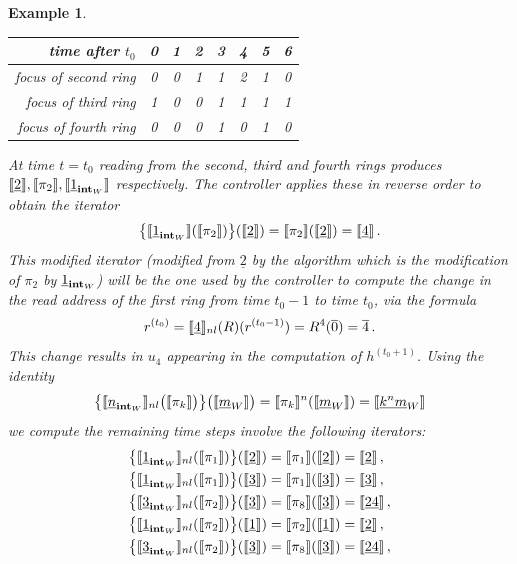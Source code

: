 \documentclass[english,letter paper,12pt,leqno]{article}
\theoremstyle{example}
\newtheorem{example}[theorem]{Example}
\numberwithin{equation}{section}
\begin{document}
\begin{example}
\begin{center}
\begin{tabular}{|r|c|c|c|c|c|c|c|}
\hline
time after $t_0$ & 0 & 1 & 2 & 3 & 4 & 5 & 6\\
\hline
focus of second ring & 0 & 0 & 1 & 1 & 2 & 1 & 0\\
\hline
focus of third ring & 1 & 0 & 0 & 1 & 1 & 1 & 1\\
\hline
focus of fourth ring & 0 & 0 & 0 & 1 & 0 & 1 & 0\\
\hline
\end{tabular}
\end{center}
At time $t = t_0$ reading from the second, third and fourth rings produces $\llbracket \underline{2} \rrbracket, \llbracket \pi_2 \rrbracket, \llbracket \underline{1}_{\textbf{int}_W} \rrbracket$ respectively. The controller applies these in reverse order to obtain the iterator
\[
\big\{ \llbracket \underline{1}_{\textbf{int}_W} \rrbracket( \llbracket \pi_2 \rrbracket ) \big\}( \llbracket \underline{2} \rrbracket ) = \llbracket \pi_2 \rrbracket( \llbracket \underline{2} \rrbracket ) = \llbracket \underline{4} \rrbracket\,.
\]
This modified iterator (modified from $\underline{2}$ by the algorithm which is the modification of $\pi_2$ by $\underline{1}_{\textbf{int}_W}$) will be the one used by the controller to compute the change in the read address of the first ring from time $t_0 - 1$ to time $t_0$, via the formula
\[
r^{(t_0)} = \llbracket \underline{4} \rrbracket_{nl}(R)( r^{(t_0 - 1)} ) = R^4( \overline{0} ) = \overline{4}\,.
\]
This change results in $u_4$ appearing in the computation of $h^{(t_0+1)}$. Using the identity
\begin{gather*}
\big\{\llbracket \underline{n}_{\textbf{int}_W} \rrbracket_{nl}\big( \llbracket \pi_k \rrbracket \big)\big\}\big( \llbracket \underline{m}_W \rrbracket \big) = \llbracket \pi_k \rrbracket^n( \llbracket \underline{m}_W \rrbracket ) = \llbracket \underline{k^n m}_W \rrbracket
\end{gather*}
we compute the remaining time steps involve the following iterators:
\begin{align*}
\big\{ \den{\underline{1}_{\inta_W}}_{nl}( \den{\pi_1} ) \big\}( \den{\underline{2}} ) &= \den{\pi_1}( \den{\underline{2}} ) = \den{\underline{2}}\,,\\
\big\{ \den{\underline{1}_{\inta_W}}_{nl}( \den{\pi_1} ) \big\}( \den{\underline{3}} ) &= \den{\pi_1}( \den{\underline{3}} ) = \den{\underline{3}}\,,\\
\big\{ \den{\underline{3}_{\inta_W}}_{nl}( \den{\pi_2} ) \big\}( \den{\underline{3}} ) &= \den{\pi_8}( \den{\underline{3}} ) = \den{\underline{24}}\,,\\
\big\{ \den{\underline{1}_{\inta_W}}_{nl}( \den{\pi_2} ) \big\}( \den{\underline{1}} ) &= \den{\pi_2}( \den{\underline{1}} ) = \den{\underline{2}}\,,\\
\big\{ \den{\underline{3}_{\inta_W}}_{nl}( \den{\pi_2} ) \big\}( \den{\underline{3}} ) &= \den{\pi_8}( \den{\underline{3}} ) = \den{\underline{24}}\,,\\

\end{align*}
\end{example}
\end{document}
